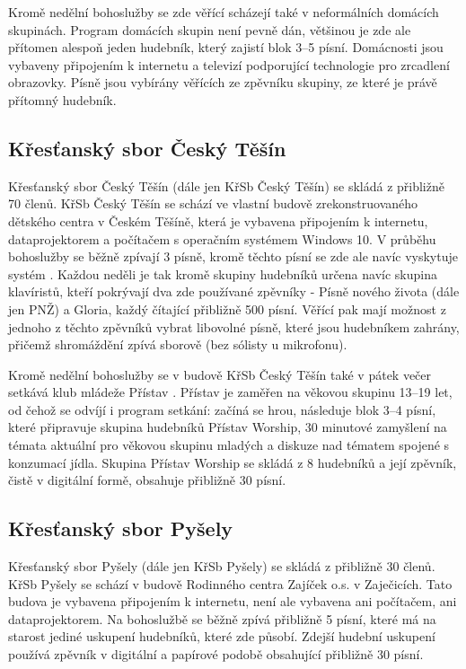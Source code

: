 Kromě nedělní bohoslužby se zde věřící scházejí také v neformálních domácích skupinách. Program domácích skupin není pevně dán, většinou je zde ale přítomen alespoň jeden hudebník, který zajistí blok 3--5 písní. Domácnosti jsou vybaveny připojením k internetu a televizí podporující technologie pro zrcadlení obrazovky. Písně jsou vybírány  věřících ze zpěvníku skupiny, ze které je právě přítomný hudebník.

\subsection{Křesťanský sbor Český Těšín}
\label{krsb-tesin}

Křesťanský sbor Český Těšín (dále jen KřSb Český Těšín) \cite{krsb-tesin} se skládá z přibližně 70 členů. KřSb Český Těšín se schází ve vlastní budově zrekonstruovaného dětského centra v Českém Těšíně, která je vybavena připojením k internetu, dataprojektorem a počítačem s operačním systémem Windows 10. V průběhu bohoslužby se běžně zpívají 3 písně, kromě těchto písní se zde ale navíc vyskytuje systém . Každou neděli je tak kromě skupiny hudebníků určena navíc skupina klavíristů, kteří pokrývají dva zde používané zpěvníky - Písně nového života (dále jen PNŽ) a Gloria, každý čítající přibližně 500 písní. Věřící pak mají možnost z jednoho z těchto zpěvníků vybrat libovolné písně, které jsou hudebníkem zahrány, přičemž shromáždění zpívá sborově (bez sólisty u mikrofonu).

Kromě nedělní bohoslužby se v budově KřSb Český Těšín také v pátek večer setkává klub mládeže Přístav \cite{krsb-pristav}. Přístav je zaměřen na věkovou skupinu 13--19 let, od čehož se odvíjí i program setkání: začíná se hrou, následuje blok 3--4 písní, které připravuje skupina hudebníků Přístav Worship, 30 minutové zamyšlení na témata aktuální pro věkovou skupinu mladých a diskuze nad tématem spojené s konzumací jídla. Skupina Přístav Worship se skládá z 8 hudebníků a její zpěvník, čistě v digitální formě, obsahuje přibližně 30 písní.

\subsection{Křesťanský sbor Pyšely}
\label{krsb-pysely}

Křesťanský sbor Pyšely (dále jen KřSb Pyšely) \cite{krsb-pysely} se skládá z přibližně 30 členů. KřSb Pyšely se schází v budově Rodinného centra Zajíček o.s. v Zaječicích. Tato budova je vybavena připojením k internetu, není ale vybavena ani počítačem, ani dataprojektorem. Na bohoslužbě se běžně zpívá přibližně 5 písní, které má na starost jediné uskupení hudebníků, které zde působí. Zdejší hudební uskupení používá zpěvník v digitální a papírové podobě obsahující přibližně 30 písní.

